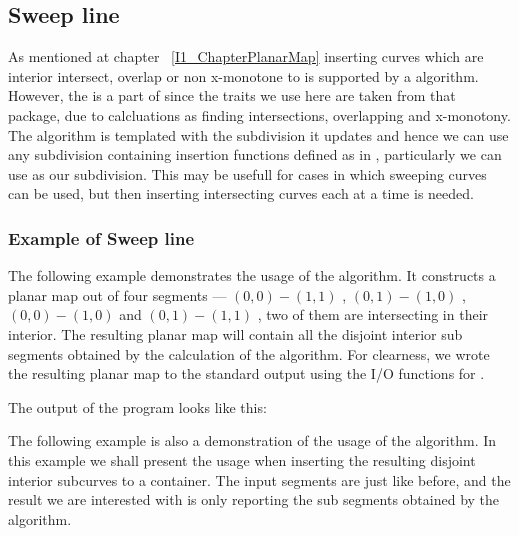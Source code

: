 \subsection*{Sweep line}
As mentioned at chapter ~\ref{I1_ChapterPlanarMap} inserting curves which are interior intersect, 
overlap or non x-monotone to  is supported by a  algorithm. However, 
the  is a part of  since 
the traits we use here are taken from that package, due to calcluations as finding 
intersections, overlapping and x-monotony. 
The  algorithm is templated with the subdivision it updates and hence we can use 
any subdivision containing insertion functions defined as in , particularly 
we can use  as our subdivision. This may be usefull for cases 
in which sweeping curves can be used, but then inserting intersecting curves each at a time is needed.


\subsubsection{Example of Sweep line}
\label{ssec:example1}
The following example demonstrates the usage of the  algorithm.
It constructs a planar map out of four segments --- $(0,0)-(1,1)$ , $(0,1)-(1,0)$ , 
$(0,0)-(1,0)$ and $(0,1)-(1,1)$ , two of them are intersecting in their interior.
The resulting planar map will contain all the disjoint interior sub segments obtained 
by the calculation of the  algorithm. For clearness, we wrote the resulting 
planar map to the standard output using the I/O functions for .


The output of the program looks like this:


\label{ssec:example2}
The following example is also a demonstration of the usage of the  algorithm. 
In this example we shall present the usage when inserting the resulting disjoint interior 
subcurves to a container. 
The input segments are just like before, and the result we are interested with is only 
reporting the sub segments obtained by the  algorithm.


